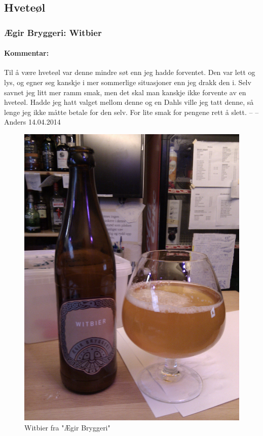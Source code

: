 \documentclass[12pt,a4paper,oneside,norsk]{article}
\begin{document}
\newpage
\subsection{Hveteøl}
\subsubsection{Ægir Bryggeri: Witbier}
\paragraph{Kommentar:} Til å være hveteøl var denne mindre søt enn jeg hadde forventet. Den var lett og lys, og egner seg kanskje i mer sommerlige situasjoner enn jeg drakk den i. Selv savnet jeg litt mer ramm smak, men det skal man kanskje ikke forvente av en hveteøl. Hadde jeg hatt valget mellom denne og en Dahls ville jeg tatt denne, så lenge jeg ikke måtte betale for den selv. For lite smak for pengene rett å slett.
\newline
-- -- Anders 14.04.2014

\begin{figure} [H]
\centering
\includegraphics[scale=0.1, angle=0]{Bilder/Ol/EgirBryggeriWitbier.jpg}
\caption{Witbier fra "Ægir Bryggeri"}
\end{figure}
\end{document}
